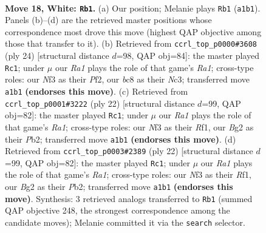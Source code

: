 \documentclass[11pt]{article}
\begin{document}
\clearpage

\begin{figure}[p]\centering
\begin{subfigure}{0.46\textwidth}\centering
\resizebox{\linewidth}{!}{%
\newchessgame
\chessboard[
  setfen={r1bnr3/1pppkppp/p2q4/B2P4/4n3/4PNP1/PP3PBP/R2Q1RK1 w - - 11 18},
  showmover=false,
  pgfstyle=straightmove, color=movearrow, markmove={a1-b1}
]}
\caption{}
\end{subfigure}\hfill
\begin{subfigure}{0.46\textwidth}\centering
\resizebox{\linewidth}{!}{%
\newchessgame
\chessboard[
  setfen={r4rk1/pp3ppp/2pqpn2/5n2/2BP4/2N1P3/PP3PPP/R2Q1RK1 w - - 3 13},
  showmover=false,
  pgfstyle=straightmove, color=movearrow, markmove={a1-c1}
]}
\caption{}
\end{subfigure}
\\[4pt]
\begin{subfigure}{0.46\textwidth}\centering
\resizebox{\linewidth}{!}{%
\newchessgame
\chessboard[
  setfen={r1b2rk1/p3ppbp/2pp1np1/2q5/2P5/2N1P1P1/PP1B1PBP/R2Q1RK1 w - - 0 12},
  showmover=false,
  pgfstyle=straightmove, color=movearrow, markmove={a1-c1}
]}
\caption{}
\end{subfigure}\hfill
\begin{subfigure}{0.46\textwidth}\centering
\resizebox{\linewidth}{!}{%
\newchessgame
\chessboard[
  setfen={r1b2rk1/p3ppbp/2pp1np1/2q5/2P5/2N1P1P1/PP1B1PBP/R2Q1RK1 w - - 0 12},
  showmover=false,
  pgfstyle=straightmove, color=movearrow, markmove={a1-c1}
]}
\caption{}
\end{subfigure}
\caption{\textbf{Move 18, White: \texttt{Rb1}.} (a) Our position; Melanie plays \texttt{Rb1} (\texttt{a1b1}). Panels (b)--(d) are the retrieved master positions whose correspondence most drove this move (highest QAP objective among those that transfer to it). (b) Retrieved from \texttt{ccrl\_top\_p0000\#3608} (ply 24) [structural distance $d$=98, QAP obj=84]: the master played \texttt{Rc1}; under $\mu$ our \emph{Ra1} plays the role of that game's \emph{Ra1}; cross-type roles: our \emph{N}f3 as their \emph{P}f2, our \emph{b}c8 as their \emph{N}c3; transferred move \texttt{a1b1} \textbf{(endorses this move)}. (c) Retrieved from \texttt{ccrl\_top\_p0001\#3222} (ply 22) [structural distance $d$=99, QAP obj=82]: the master played \texttt{Rc1}; under $\mu$ our \emph{Ra1} plays the role of that game's \emph{Ra1}; cross-type roles: our \emph{N}f3 as their \emph{R}f1, our \emph{B}g2 as their \emph{P}b2; transferred move \texttt{a1b1} \textbf{(endorses this move)}. (d) Retrieved from \texttt{ccrl\_top\_p0003\#2389} (ply 22) [structural distance $d$=99, QAP obj=82]: the master played \texttt{Rc1}; under $\mu$ our \emph{Ra1} plays the role of that game's \emph{Ra1}; cross-type roles: our \emph{N}f3 as their \emph{R}f1, our \emph{B}g2 as their \emph{P}b2; transferred move \texttt{a1b1} \textbf{(endorses this move)}. Synthesis: 3 retrieved analogs transferred to \texttt{Rb1} (summed QAP objective 248, the strongest correspondence among the candidate moves); Melanie committed it via the \texttt{search} selector.}
\label{fig:thought-m34}
\end{figure}
\end{document}
